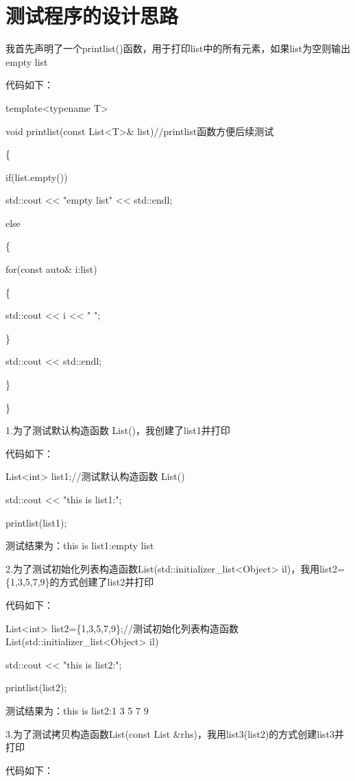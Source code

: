 \documentclass[UTF8]{ctexart}
\begin{document}
\pagestyle{fancy}
\fancyhead{}

\section{测试程序的设计思路}


我首先声明了一个printlist()函数，用于打印list中的所有元素，如果list为空则输出empty list

代码如下：

template<typename T>


void printlist(const List<T>\& list)//printlist函数方便后续测试


\{   

    if(list.empty())
    
        std::cout << "empty list" << std::endl;
        
    else
    
    \{
    
    for(const auto\& i:list)
   
    \{

        std::cout << i << " ";

    \}

    std::cout << std::endl;

    \}

\}

1.为了测试默认构造函数 List()，我创建了list1并打印

代码如下：

List<int> list1;//测试默认构造函数 List()

    std::cout << "this is list1:";

    printlist(list1);

测试结果为：this is list1:empty list

2.为了测试初始化列表构造函数List(std::initializer\_list<Object> il)，我用list2=\{1,3,5,7,9\}的方式创建了list2并打印

代码如下：

 List<int> list2=\{1,3,5,7,9\};//测试初始化列表构造函数List(std::initializer\_list<Object> il)

    std::cout << "this is list2:";

    printlist(list2);

测试结果为：this is list2:1 3 5 7 9

3.为了测试拷贝构造函数List(const List \&rhs)，我用list3(list2)的方式创建list3并打印

代码如下：
\end{document}
